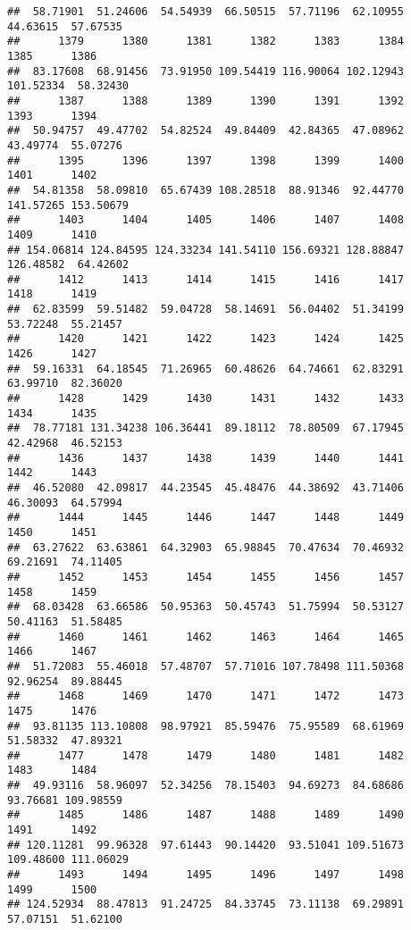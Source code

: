 \documentclass[
]{article}
\begin{document}
\begin{verbatim}
##  58.71901  51.24606  54.54939  66.50515  57.71196  62.10955  44.63615  57.67535 
##      1379      1380      1381      1382      1383      1384      1385      1386 
##  83.17608  68.91456  73.91950 109.54419 116.90064 102.12943 101.52334  58.32430 
##      1387      1388      1389      1390      1391      1392      1393      1394 
##  50.94757  49.47702  54.82524  49.84409  42.84365  47.08962  43.49774  55.07276 
##      1395      1396      1397      1398      1399      1400      1401      1402 
##  54.81358  58.09810  65.67439 108.28518  88.91346  92.44770 141.57265 153.50679 
##      1403      1404      1405      1406      1407      1408      1409      1410 
## 154.06814 124.84595 124.33234 141.54110 156.69321 128.88847 126.48582  64.42602 
##      1412      1413      1414      1415      1416      1417      1418      1419 
##  62.83599  59.51482  59.04728  58.14691  56.04402  51.34199  53.72248  55.21457 
##      1420      1421      1422      1423      1424      1425      1426      1427 
##  59.16331  64.18545  71.26965  60.48626  64.74661  62.83291  63.99710  82.36020 
##      1428      1429      1430      1431      1432      1433      1434      1435 
##  78.77181 131.34238 106.36441  89.18112  78.80509  67.17945  42.42968  46.52153 
##      1436      1437      1438      1439      1440      1441      1442      1443 
##  46.52080  42.09817  44.23545  45.48476  44.38692  43.71406  46.30093  64.57994 
##      1444      1445      1446      1447      1448      1449      1450      1451 
##  63.27622  63.63861  64.32903  65.98845  70.47634  70.46932  69.21691  74.11405 
##      1452      1453      1454      1455      1456      1457      1458      1459 
##  68.03428  63.66586  50.95363  50.45743  51.75994  50.53127  50.41163  51.58485 
##      1460      1461      1462      1463      1464      1465      1466      1467 
##  51.72083  55.46018  57.48707  57.71016 107.78498 111.50368  92.96254  89.88445 
##      1468      1469      1470      1471      1472      1473      1475      1476 
##  93.81135 113.10808  98.97921  85.59476  75.95589  68.61969  51.58332  47.89321 
##      1477      1478      1479      1480      1481      1482      1483      1484 
##  49.93116  58.96097  52.34256  78.15403  94.69273  84.68686  93.76681 109.98559 
##      1485      1486      1487      1488      1489      1490      1491      1492 
## 120.11281  99.96328  97.61443  90.14420  93.51041 109.51673 109.48600 111.06029 
##      1493      1494      1495      1496      1497      1498      1499      1500 
## 124.52934  88.47813  91.24725  84.33745  73.11138  69.29891  57.07151  51.62100 

\end{verbatim}
\end{document}

